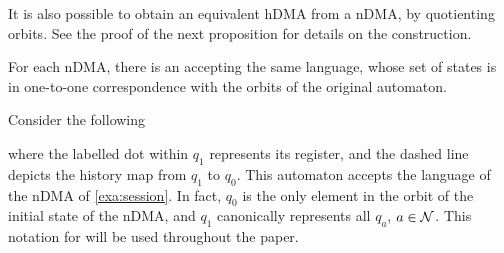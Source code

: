 \noindent It is also possible to obtain an equivalent hDMA from a nDMA, by quotienting orbits. See the proof of the next proposition for details on the construction.

\begin{proposition}\label{prop:ndma-to-hdma}
For each nDMA, there is an \hdma{} accepting the same language, whose set of states is in one-to-one correspondence with the orbits of the original automaton.
\end{proposition}


\begin{example}
Consider the following \hdma{} 

\begin{center}
\end{center}
%
where the labelled dot within $q_1$ represents its register, and the dashed line depicts the history map from $q_1$ to $q_0$. This automaton accepts the language of the nDMA of \cref{exa:session}. In fact, $q_0$ is the only element in the orbit of the initial state of the nDMA, and $q_1$ canonically represents all $q_a$, $a \in \mathcal{N}$. This notation for \hdmas{} will be used throughout the paper.\end{example}



% 
